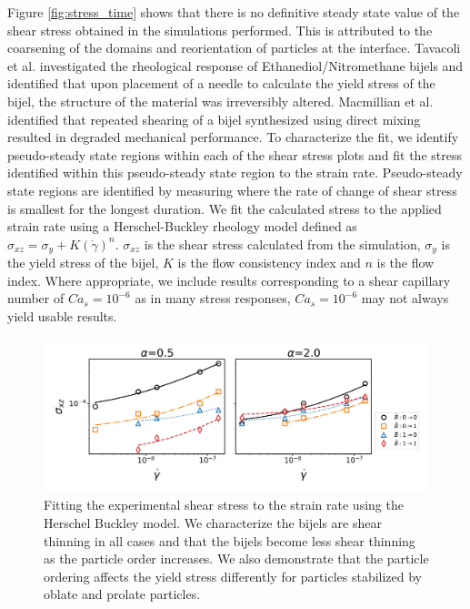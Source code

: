 Figure \ref{fig:stress_time} shows that there is no definitive steady state value of the shear stress obtained in the simulations performed. This is
attributed to the coarsening of the domains and reorientation of particles at the interface. \cite{tavacoli_novel_2011,macmillan_rheological_2019} 
Tavacoli et al. investigated the rheological response of Ethanediol/Nitromethane bijels and identified that upon placement of a needle to calculate the yield
stress of the bijel, the structure of the material was irreversibly altered. \cite{tavacoli_novel_2011} Macmillian et al. identified that repeated 
shearing of a bijel synthesized using direct mixing resulted in degraded mechanical performance. \cite{macmillan_rheological_2019}
To characterize the fit, we identify pseudo-steady state regions within each of the shear stress plots and fit the stress identified within this 
pseudo-steady state region to the strain rate. Pseudo-steady state regions are identified by measuring where the rate of change of shear stress is 
smallest for the longest duration. We fit the calculated stress to the applied strain rate using a Herschel-Buckley rheology model defined as
$\sigma_{xz} = \sigma_{y} + K(\dot{\gamma})^{n}$. $\sigma_{xz}$ is the shear stress calculated from the simulation, $\sigma_{y}$ is the yield stress of the bijel, 
$K$ is the flow consistency index and $n$ is the flow index. Where appropriate, we include results corresponding to a shear capillary number of 
$Ca_s = 10^{-6}$ as in many stress responses, $Ca_s = 10^{-6}$ may not always yield usable results. 

\begin{figure} 
    \centering 
    \includegraphics[scale=0.4]{../figures/results/paper3/stress_strain-all.png} 
    \caption{Fitting the experimental shear stress to the strain rate using the Herschel Buckley model. We characterize the bijels are 
             shear thinning in all cases and that the bijels become less shear thinning as the particle order increases. We also
             demonstrate that the particle ordering affects the yield stress differently for particles stabilized by oblate and 
             prolate particles.} 
    \label{fig:stress_strain} 
\end{figure}

